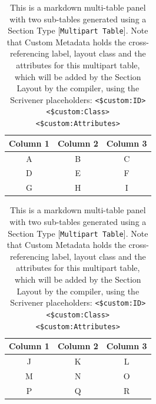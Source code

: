 \documentclass[
  12pt,
  a4paper,
  oneside]{scrbook}
\begin{document}
\begin{table}

\begin{minipage}[t]{\linewidth}

{\centering 

\begin{tabular}[t]{ccc}
\toprule
Column 1 & Column 2 & Column 3\\
\midrule
A & B & C\\
D & E & F\\
G & H & I\\
\bottomrule
\end{tabular}

}

\end{minipage}%
\newline
\begin{minipage}[t]{\linewidth}

{\centering 

\begin{tabular}[t]{ccc}
\toprule
Column 1 & Column 2 & Column 3\\
\midrule
J & K & L\\
M & N & O\\
P & Q & R\\
\bottomrule
\end{tabular}

}

\end{minipage}%

\caption{\label{tbl-panel2}This is a markdown multi-table panel with two
sub-tables generated using a Section Type
{[}\texttt{Multipart\ Table}{]}. Note that Custom Metadata holds the
cross-referencing label, layout class and the attributes for this
multipart table, which will be added by the Section Layout by the
compiler, using the Scrivener placeholders:
\texttt{\textless{}\hspace{0pt}\$\hspace{0pt}\hspace{0pt}custom:ID\textgreater{}}
\texttt{\textless{}\hspace{0pt}\$\hspace{0pt}\hspace{0pt}custom:Class\textgreater{}}
\texttt{\textless{}\hspace{0pt}\$\hspace{0pt}\hspace{0pt}custom:Attributes\textgreater{}}}

\end{table}
\end{document}
